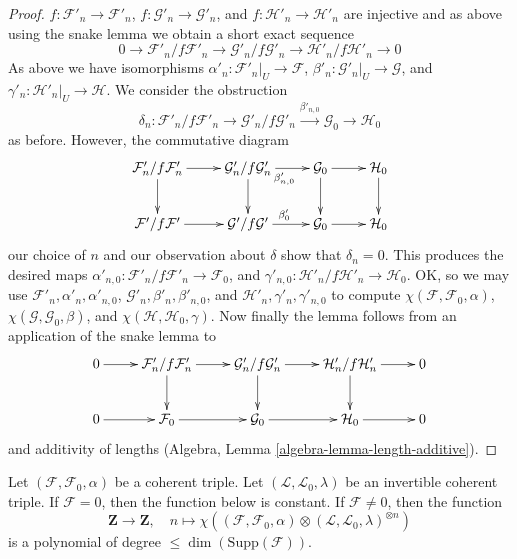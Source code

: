\begin{proof}
$f : \mathcal{F}'_n \to \mathcal{F}'_n$,
$f : \mathcal{G}'_n \to \mathcal{G}'_n$, and
$f : \mathcal{H}'_n \to \mathcal{H}'_n$ are injective
and as above using the snake lemma we obtain a short exact
sequence
$$
0 \to \mathcal{F}'_n/f\mathcal{F}'_n \to
\mathcal{G}'_n/f\mathcal{G}'_n \to
\mathcal{H}'_n/f\mathcal{H}'_n \to 0
$$
As above we have isomorphisms
$\alpha'_n : \mathcal{F}'_n|_U \to \mathcal{F}$,
$\beta'_n : \mathcal{G}'_n|_U \to \mathcal{G}$, and
$\gamma'_n : \mathcal{H}'_n|_U \to \mathcal{H}$.
We consider the obstruction
$$
\delta_n :
\mathcal{F}'_n/f\mathcal{F}'_n \to
\mathcal{G}'_n/f\mathcal{G}'_n
\xrightarrow{\beta'_{n, 0}}
\mathcal{G}_0 \to
\mathcal{H}_0
$$
as before. However, the commutative diagram
$$
\xymatrix{
\mathcal{F}'_n/f\mathcal{F}'_n \ar[r] \ar[d] &
\mathcal{G}'_n/f\mathcal{G}'_n \ar[r]_{\beta'_{n, 0}} \ar[d] &
\mathcal{G}_0 \ar[r] \ar[d] &
\mathcal{H}_0 \ar[d] \\
\mathcal{F}'/f\mathcal{F}' \ar[r] &
\mathcal{G}'/f\mathcal{G}' \ar[r]^{\beta'_0} &
\mathcal{G}_0 \ar[r] &
\mathcal{H}_0
}
$$
our choice of $n$ and our observation about $\delta$
show that $\delta_n = 0$.
This produces the desired maps
$\alpha'_{n, 0} : \mathcal{F}'_n/f\mathcal{F}'_n \to \mathcal{F}_0$, and
$\gamma'_{n, 0} : \mathcal{H}'_n/f\mathcal{H}'_n \to \mathcal{H}_0$.
OK, so we may use
$\mathcal{F}'_n, \alpha'_n, \alpha'_{n, 0}$,
$\mathcal{G}'_n, \beta'_n, \beta'_{n, 0}$, and
$\mathcal{H}'_n, \gamma'_n, \gamma'_{n, 0}$
to compute
$\chi(\mathcal{F}, \mathcal{F}_0, \alpha)$,
$\chi(\mathcal{G}, \mathcal{G}_0, \beta)$, and
$\chi(\mathcal{H}, \mathcal{H}_0, \gamma)$.
Now finally the lemma follows from
an application of the snake lemma to
$$
\xymatrix{
0 \ar[r] &
\mathcal{F}'_n/f\mathcal{F}'_n \ar[r] \ar[d] &
\mathcal{G}'_n/f\mathcal{G}'_n \ar[r] \ar[d] &
\mathcal{H}'_n/f\mathcal{H}'_n \ar[r] \ar[d] &
0 \\
0 \ar[r] &
\mathcal{F}_0 \ar[r] &
\mathcal{G}_0 \ar[r] &
\mathcal{H}_0 \ar[r] &
0
}
$$
and additivity of lengths (Algebra, Lemma \ref{algebra-lemma-length-additive}).
\end{proof}

\begin{proposition}
\label{proposition-hilbert-triple}
Let $(\mathcal{F}, \mathcal{F}_0, \alpha)$ be a coherent triple.
Let $(\mathcal{L}, \mathcal{L}_0, \lambda)$ be an invertible coherent
triple. If $\mathcal{F} = 0$, then the function below is constant. If
$\mathcal{F} \not = 0$, then the function
$$
\mathbf{Z} \longrightarrow \mathbf{Z},\quad
n \longmapsto
\chi((\mathcal{F}, \mathcal{F}_0, \alpha) \otimes
(\mathcal{L}, \mathcal{L}_0, \lambda)^{\otimes n})
$$
is a polynomial of degree $\leq \dim(\text{Supp}(\mathcal{F}))$.
\end{proposition}


